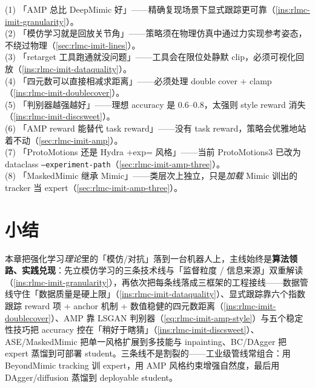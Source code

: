 \begin{pitfall}[本章常见误解一览]
(1) 「AMP 总比 DeepMimic 好」——精确复现场景下显式跟踪更可靠（\cref{ins:rlmc-imit-granularity}）。\\
(2) 「模仿学习就是回放关节角」——策略须在物理仿真中通过力实现参考姿态，不绕过物理（\cref{sec:rlmc-imit-lines}）。\\
(3) 「retarget 工具跑通就没问题」——工具会在限位处静默 clip，必须可视化回放（\cref{ins:rlmc-imit-dataquality}）。\\
(4) 「四元数可以直接相减求距离」——必须处理 double cover + clamp（\cref{ins:rlmc-imit-doublecover}）。\\
(5) 「判别器越强越好」——理想 accuracy 是 0.6--0.8，太强则 style reward 消失（\cref{ins:rlmc-imit-discsweet}）。\\
(6) 「AMP reward 能替代 task reward」——没有 task reward，策略会优雅地站着不动（\cref{sec:rlmc-imit-amp}）。\\
(7) 「ProtoMotions 还是 Hydra +exp= 风格」——当前 ProtoMotions3 已改为 dataclass \texttt{--experiment-path}（\cref{sec:rlmc-imit-amp-three}）。\\
(8) 「MaskedMimic 继承 Mimic」——类层次上独立，只是\emph{加载} Mimic 训出的 tracker 当 expert（\cref{sec:rlmc-imit-amp-three}）。
\end{pitfall}

\section*{小结}
\label{sec:rlmc-imit-summary}

本章把强化学习\emph{理论}里的「模仿/对抗」落到一台机器人上，主线始终是\textbf{算法领路、实践兑现}：先立模仿学习的三条技术线与「监督粒度 / 信息来源」双重解读（\cref{ins:rlmc-imit-granularity}），再依次把每条线落成三框架的工程接线——数据管线守住「数据质量是硬上限」（\cref{ins:rlmc-imit-dataquality}）、显式跟踪靠六个指数跟踪 reward 项 + anchor 机制 + 数值稳健的四元数距离（\cref{ins:rlmc-imit-doublecover}）、AMP 靠 LSGAN 判别器（\cref{eq:rlmc-imit-amp-style}）与五个稳定性技巧把 accuracy 控在「稍好于瞎猜」（\cref{ins:rlmc-imit-discsweet}）、ASE/MaskedMimic 把单一风格扩展到多技能与 inpainting、BC/DAgger 把 expert 蒸馏到可部署 student。三条线不是割裂的——工业级管线常组合：用 BeyondMimic tracking 训 expert，用 AMP 风格约束增强自然度，最后用 DAgger/diffusion 蒸馏到 deployable student。

